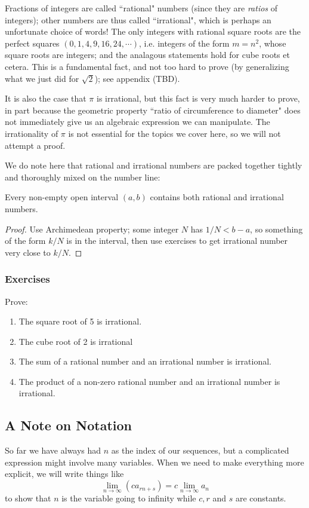 Fractions of integers are called ``rational" numbers (since they are \emph{ratios} of integers); other numbers are thus called ``irrational", which is perhaps an unfortunate choice of words! The only integers with rational square roots are the perfect squares $(0,1,4,9,16,24,\cdots)$, i.e. integers of the form $m=n^2$, whose square roots are integers; and the analagous statements hold for cube roots et cetera. This is a fundamental fact, and not too hard to prove (by generalizing what we just did for $\sqrt{2}$); see appendix (TBD).

It is also the case that $\pi$ is irrational, but this fact is very much harder to prove, in part because the geometric property ``ratio of circumference to diameter" does not immediately give us an algebraic expression we can manipulate. The irrationality of $\pi$ is not essential for the topics we cover here, so we will not attempt a proof.

We do note here that rational and irrational numbers are packed together tightly and thoroughly mixed on the number line:

\begin{thm}
Every non-empty open interval $(a,b)$ contains both rational and irrational numbers.
\end{thm}
\begin{proof}
Use Archimedean property; some integer $N$ has $1/N < b-a$, so something of the form $k/N$ is in the interval, then use exercises to get irrational number very close to $k/N$.
\end{proof}


\subsubsection{Exercises}
Prove:
\begin{enumerate}
\item The square root of 5 is irrational.
\item The cube root of 2 is irrational
\item The sum of a rational number and an irrational number is irrational.
\item The product of a non-zero rational number and an irrational number is irrational.
\end{enumerate}


\subsection{A Note on Notation}
So far we have always had $n$ as the index of our sequences, but a complicated expression might involve many variables. When we need to make everything more explicit, we will write things like
\[
\lim_{n \to \infty}(ca_{rn+s}) = c\lim_{n \to \infty} a_n
\]
to show that $n$ is the variable going to infinity while $c,r$ and $s$ are constants.


